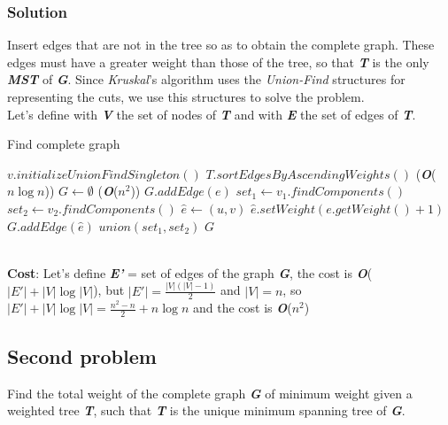 \documentclass[11pt]{article}
\begin{document}
\subsubsection*{Solution}
Insert edges that are not in the tree so as to obtain the complete graph. These edges must have a greater weight than those of the tree, so that \textbf{\textit{T}} is the only \textbf{\textit{MST}} of \textbf{\textit{G}}. Since \textit{Kruskal}'s algorithm uses the \textit{Union-Find} structures for representing the cuts, we use this structures to solve the problem. \\
Let's define with \textbf{\textit{V}} the set of nodes of \textbf{\textit{T}} and with \textbf{\textit{E}} the set of edges of \textbf{\textit{T}}.
\begin{algorithm}
	\caption{Find complete graph}\label{euclid}
	\begin{algorithmic}[1]
			\State $v.initializeUnionFindSingleton()$
		\EndFor
		\State $T.sortEdgesByAscendingWeights()$ \qquad \qquad \qquad \qquad \qquad \qquad \qquad (\textbf{\textit{O}}($n\log{n}$))
		\State $G \gets \emptyset$
		 \qquad \qquad \qquad \qquad \qquad \qquad \qquad \qquad \qquad \qquad (\textbf{\textit{O}}($n^2$))
			\State  $G.addEdge(e)$
			\State  $set_1 \gets v_1.findComponents()$
			\State  $set_2 \gets v_2.findComponents()$
					\State $\hat{e} \gets (u, v)$
						\State $\hat{e}.setWeight(e.getWeight() + 1)$
						\State $G.addEdge(\hat{e})$
					\EndIf
				\EndFor
			\EndFor
			\State $union(set_1, set_2)$
		\EndFor
		\State \Return $G$
	\end{algorithmic}
\end{algorithm} \\
\textbf{Cost}: Let's define \textbf{\textit{E'}} = set of edges of the graph \textbf{\textit{G}}, the cost is \textbf{\textit{O}}($|E'| + |V|\log{|V|}$), but $|E'| = \frac{|V|(|V| - 1)}{2}$ and $|V| = n$, so $|E'| + |V|\log{|V|} = \frac{n^2 - n}{2} + n\log{n}$ and the cost is \textbf{\textit{O}}($n^2$)
\subsection*{Second problem}
Find the total weight of the complete graph \textbf{\textit{G}} of minimum weight given a weighted tree \textbf{\textit{T}}, such that  \textbf{\textit{T}} is the unique minimum spanning tree of \textbf{\textit{G}}.
\end{document}
